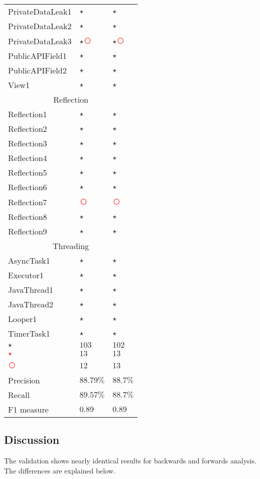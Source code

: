 \documentclass[../draft.tex]{subfiles}
\newcommand{\fp}{\textcolor{white}{\textcircled{\textcolor{red}{$\star$}}}}
\newcommand{\fn}{\textcolor{red}{\textcircled{ }}}
\newcommand{\tp}[0]{\textcircled{$\star$}}
\newcommand{\tsub}[1]{\multicolumn{3}{c}{#1}\\\hline}
\begin{document}
\begin{longtable}{l | l | l}
        PrivateDataLeak1 & \tp & \tp\\
        PrivateDataLeak2 & \tp & \tp\\
        PrivateDataLeak3 & \tp \fn & \tp \fn\\
        PublicAPIField1 & \tp & \tp\\
        PublicAPIField2 & \tp & \tp\\
        View1 & \tp & \tp\\
        \hline
        \tsub{Reflection}
        Reflection1 & \tp & \tp\\
        Reflection2 & \tp & \tp\\
        Reflection3 & \tp & \tp\\
        Reflection4 & \tp & \tp\\
        Reflection5 & \tp & \tp\\
        Reflection6 & \tp & \tp\\
        Reflection7 & \fn & \fn\\
        Reflection8 & \tp & \tp\\
        Reflection9 & \tp & \tp\\
        \hline
        \tsub{Threading}
        AsyncTask1 & \tp & \tp\\
        Executor1 & \tp & \tp\\
        JavaThread1 & \tp & \tp\\
        JavaThread2 & \tp & \tp\\
        Looper1 & \tp & \tp\\
        TimerTask1 & \tp & \tp\\
        \hline\hline  %
        \tp &$ 103 $&$ 102 $\\
        \fp &$ 13 $&$ 13 $\\
        \fn &$ 12 $&$ 13 $\\
        Precision & $ 88.79 \%$ & $ 88.7 \%$\\
        Recall & $ 89.57 \% $ & $ 88.7 \%$\\
        F1 measure & $ 0.89 $ & $ 0.89 $\\
    \end{longtable}

    \subsection{Discussion}
    The validation shows nearly identical results for backwards and forwards analysis. The differences are explained below. 
    
\end{document}

